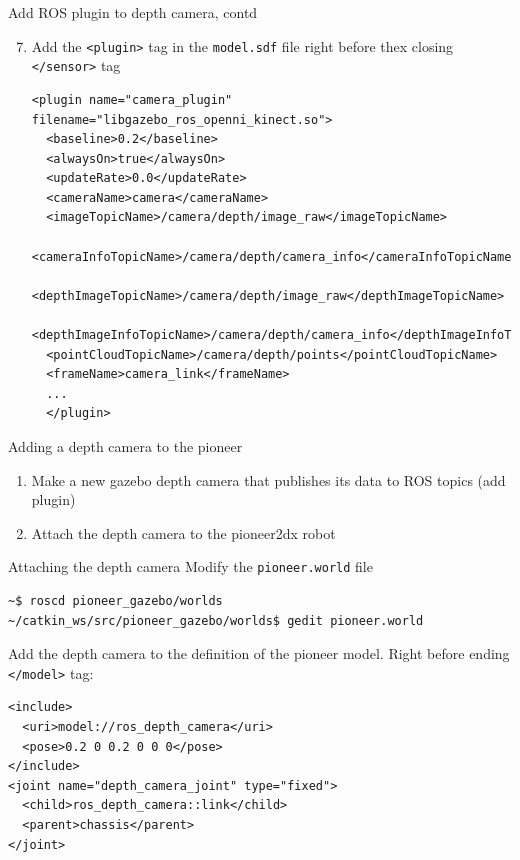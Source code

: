 \documentclass[presentation,aspectratio=1610]{beamer}
\begin{document}
\begin{frame}[fragile,label=sec-3-4]{Add ROS plugin to depth camera, contd}
 \begin{enumerate}
\setcounter{enumi}{6}
\item Add the \texttt{<plugin>} tag in the \texttt{model.sdf} file right before thex closing \texttt{</sensor>} tag
\begin{verbatim}
<plugin name="camera_plugin" filename="libgazebo_ros_openni_kinect.so">
  <baseline>0.2</baseline>
  <alwaysOn>true</alwaysOn>
  <updateRate>0.0</updateRate>
  <cameraName>camera</cameraName>
  <imageTopicName>/camera/depth/image_raw</imageTopicName>
  <cameraInfoTopicName>/camera/depth/camera_info</cameraInfoTopicName>
  <depthImageTopicName>/camera/depth/image_raw</depthImageTopicName>
  <depthImageInfoTopicName>/camera/depth/camera_info</depthImageInfoTopicName>
  <pointCloudTopicName>/camera/depth/points</pointCloudTopicName>
  <frameName>camera_link</frameName>
  ...
  </plugin>
\end{verbatim}
\end{enumerate}
\end{frame}

\begin{frame}[label=sec-3-5]{Adding a depth camera to the pioneer}
\begin{enumerate}
\item Make a new gazebo depth camera that publishes its data to ROS topics (add plugin)
\item \alert{Attach the depth camera to the pioneer2dx robot}
\end{enumerate}
\end{frame}

\begin{frame}[fragile,label=sec-3-6]{Attaching the depth camera}
 Modify the \texttt{pioneer.world} file
\begin{verbatim}
~$ roscd pioneer_gazebo/worlds
~/catkin_ws/src/pioneer_gazebo/worlds$ gedit pioneer.world
\end{verbatim}

Add the depth camera to the definition of the pioneer model. Right before ending \texttt{</model>} tag:
\begin{verbatim}
<include>
  <uri>model://ros_depth_camera</uri>
  <pose>0.2 0 0.2 0 0 0</pose>
</include>
<joint name="depth_camera_joint" type="fixed">
  <child>ros_depth_camera::link</child>
  <parent>chassis</parent>
</joint>
\end{verbatim}
\end{frame}
\end{document}

